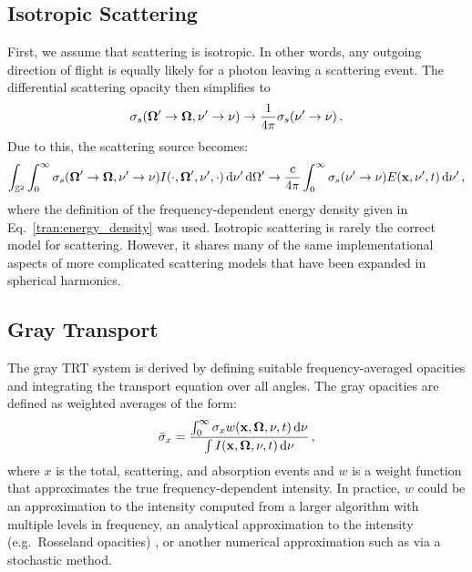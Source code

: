 \documentclass[../doc.tex]{subfiles}
\begin{document}
\subsection{Isotropic Scattering}
First, we assume that scattering is isotropic. In other words, any outgoing direction of flight is equally likely for a photon leaving a scattering event. The differential scattering opacity then simplifies to 
	\begin{equation}
		\sigma_s(\boldsymbol{\Omega}'\rightarrow\boldsymbol{\Omega},\nu'\rightarrow\nu) \rightarrow \frac{1}{4\pi}\sigma_s(\nu'\rightarrow \nu) \,. 
	\end{equation}
Due to this, the scattering source becomes: 
	\begin{equation}
		\int_{\mathbb{S}^2} \int_0^\infty \sigma_s(\boldsymbol{\Omega}'\rightarrow\boldsymbol{\Omega},\nu'\rightarrow \nu) I(\cdot,\boldsymbol{\Omega}',\nu',\cdot) \mathop{}\!\mathrm{d} \nu'\mathop{}\!\mathrm{d}\Omega' \rightarrow \frac{c}{4\pi} \int_0^\infty \sigma_s(\nu'\rightarrow\nu) E(\boldsymbol{\mathrm{x}},\nu',t) \mathop{}\!\mathrm{d} \nu' \,, 
	\end{equation}
where the definition of the frequency-dependent energy density given in Eq.~\ref{tran:energy_density} was used. Isotropic scattering is rarely the correct model for scattering. However, it shares many of the same implementational aspects of more complicated scattering models that have been expanded in spherical harmonics. 

\subsection{Gray Transport}
The gray TRT system is derived by defining suitable frequency-averaged opacities and integrating the transport equation over all angles. The gray opacities are defined as weighted averages of the form: 
	\begin{equation}
		\bar{\sigma}_x = \frac{\int_0^\infty \sigma_x w(\boldsymbol{\mathrm{x}},\boldsymbol{\Omega},\nu,t) \mathop{}\!\mathrm{d} \nu}{\int I(\boldsymbol{\mathrm{x}},\boldsymbol{\Omega},\nu,t) \mathop{}\!\mathrm{d} \nu} \,, 
	\end{equation}
where $x$ is the total, scattering, and absorption events and $w$ is a weight function that approximates the true frequency-dependent intensity. In practice, $w$ could be an approximation to the intensity computed from a larger algorithm with multiple levels in frequency, an analytical approximation to the intensity (e.g.~Rosseland opacities) \cite{pomraning2005equations}, or another numerical approximation such as via a stochastic method. 
\end{document}
